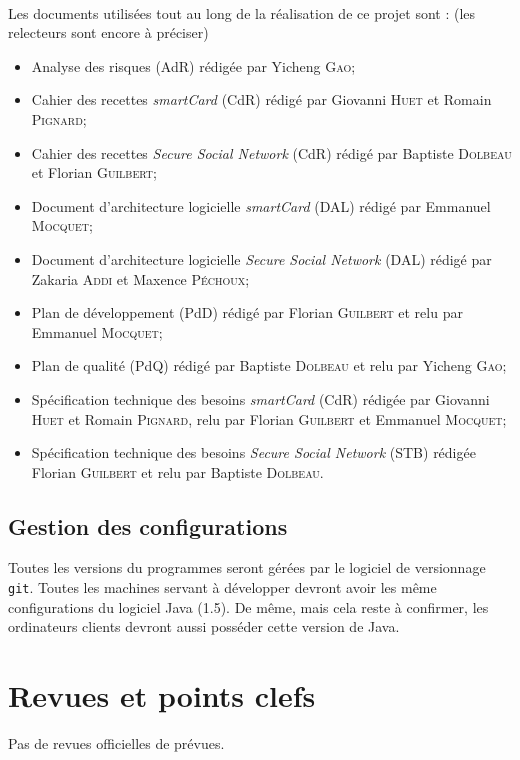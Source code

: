 \documentclass[a4paper,11pt,french]{article}
\begin{document}
\paragraph{}
Les documents utilisées tout au long de la réalisation de ce projet sont : 
(les relecteurs sont encore à préciser)
\begin{itemize}
 \item Analyse des risques (AdR) rédigée par Yicheng \textsc{Gao};
 \item Cahier des recettes \emph{smartCard} (CdR) rédigé par Giovanni 
\textsc{Huet} et Romain \textsc{Pignard};
 \item Cahier des recettes \emph{Secure Social Network} (CdR) rédigé par 
 Baptiste \textsc{Dolbeau} et Florian \textsc{Guilbert};
 \item Document d'architecture logicielle \emph{smartCard} (DAL) rédigé par 
 Emmanuel \textsc{Mocquet};
 \item Document d'architecture logicielle \emph{Secure Social Network} (DAL) 
 rédigé par Zakaria \textsc{Addi} et Maxence \textsc{Péchoux};
 \item Plan de développement (PdD) rédigé par Florian \textsc{Guilbert} 
 et relu par Emmanuel \textsc{Mocquet};
 \item Plan de qualité (PdQ) rédigé par Baptiste \textsc{Dolbeau} et
 relu par Yicheng \textsc{Gao};
 \item Spécification technique des besoins \emph{smartCard} (CdR) rédigée par 
 Giovanni \textsc{Huet} et Romain \textsc{Pignard}, relu par Florian
 \textsc{Guilbert} et Emmanuel \textsc{Mocquet};
 \item Spécification technique des besoins \emph{Secure Social Network} (STB) 
    rédigée Florian \textsc{Guilbert} et relu par Baptiste \textsc{Dolbeau}.
\end{itemize}

\subsection{Gestion des configurations}
Toutes les versions du programmes seront gérées par le logiciel de versionnage 
\texttt{git}. Toutes les machines servant à développer devront
avoir les même configurations du logiciel Java (1.5). De même, mais cela reste
à confirmer, les ordinateurs clients devront aussi posséder cette version de
Java.

\section{Revues et points clefs}
Pas de revues officielles de prévues.
\end{document}
